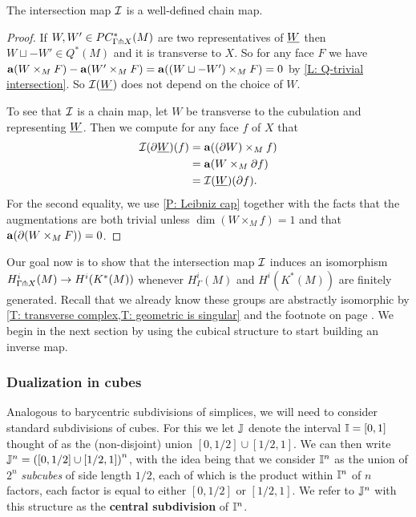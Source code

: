 \begin{proposition}
	The intersection map $\mathcal{I}$ is a well-defined chain map.
\end{proposition}

\begin{proof}
	If $W, W' \in PC^*_{\Gamma \pitchfork X}(M)$ are two representatives of $\underline{W}$ then $W \sqcup -W' \in Q^*(M)$ and it is transverse to $X$.
	So for any face $F$ we have $\mathbf{a}(W \times_M F)-\mathbf{a}(W' \times_M F) = \mathbf{a}((W \sqcup -W') \times_M F) = 0$ by \cref{L: Q-trivial intersection}.
	So $\mathcal{I}(\underline{W})$ does not depend on the choice of $W$.

	To see that $\mathcal{I}$ is a chain map, let $W$ be transverse to the cubulation and representing $\underline{W}$.
	Then we compute for any face $f$ of $X$ that
	\begin{align*}
		\mathcal{I}(\partial\underline{W})(f)& = \mathbf{a}((\partial W) \times_M f)\\
		& = \mathbf{a}(W \times_M \partial f)\\
		& = \mathcal{I}(\underline{W})(\partial f).
	\end{align*}
	For the second equality, we use \cref{P: Leibniz cap} together with the facts that the augmentations are both trivial unless $\dim(W \times_M f) = 1$ and that $\mathbf{a}(\partial (W \times_M F)) = 0$.
\end{proof}

Our goal now is to show that the intersection map $\mathcal{I}$ induces an isomorphism $H^i_{\Gamma \pitchfork X}(M) \to H^i(K^*(M))$ whenever $H^i_\Gamma(M)$ and $H^i(K^*(M))$ are finitely generated.
Recall that we already know these groups are abstractly isomorphic by \cref{T: transverse complex,T: geometric is singular} and the footnote on page \pageref{FN: cubical and singular}.
We begin in the next section by using the cubical structure to start building an inverse map.

\subsubsection{Dualization in cubes}\label{S: dual cubes}

Analogous to barycentric subdivisions of simplices, we will need to consider standard subdivisions of cubes.
For this we let $\mathbb{J}$ denote the interval $\mathbb{I} = [0,1]$ thought of as the (non-disjoint) union $[0,1/2] \cup [1/2,1]$.
We can then write $\mathbb{J}^n = \left([0,1/2] \cup [1/2,1]\right)^n$, with the idea being that we consider $\mathbb{I}^n$ as the union of $2^n$ \textit{subcubes} of side length $1/2$, each of which is the product within $\mathbb{I}^n$ of $n$ factors, each factor is equal to either $[0,1/2]$ or $[1/2,1]$.
We refer to $\mathbb{J}^n$ with this structure as the \textbf{central subdivision} of $\mathbb{I}^n$.

